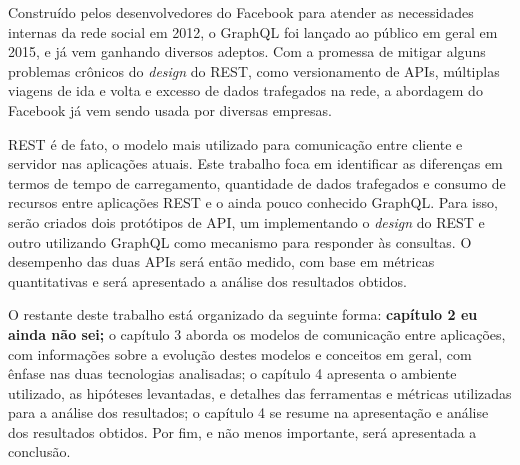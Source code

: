 Construído pelos desenvolvedores do Facebook para atender as necessidades internas da rede social em 2012, o GraphQL foi lançado ao público em geral em 2015, e já vem ganhando diversos adeptos. Com a promessa de mitigar alguns problemas crônicos do \textit{design} do REST, como versionamento de APIs, múltiplas viagens de ida e volta e excesso de dados trafegados na rede, a abordagem do Facebook já vem sendo usada por diversas empresas.

REST é de fato, o modelo mais utilizado para comunicação entre cliente e servidor nas aplicações atuais. Este trabalho foca em identificar as diferenças em termos de tempo de carregamento, quantidade de dados trafegados e consumo de recursos entre aplicações REST e o ainda pouco conhecido GraphQL. Para isso, serão criados dois protótipos de API, um implementando o \textit{design} do REST e outro utilizando GraphQL como mecanismo para responder às consultas. O desempenho das duas APIs será então medido, com base em métricas quantitativas e será apresentado a análise dos resultados obtidos.

O restante deste trabalho está organizado da seguinte forma: \textbf{capítulo 2 eu ainda não sei;} o capítulo 3 aborda os modelos de comunicação entre aplicações, com informações sobre a evolução destes modelos e conceitos em geral, com ênfase nas duas tecnologias analisadas; o capítulo 4 apresenta o ambiente utilizado, as hipóteses levantadas, e detalhes das ferramentas e métricas utilizadas para a análise dos resultados; o capítulo 4 se resume na apresentação e análise dos resultados obtidos. Por fim, e não menos importante, será apresentada a conclusão.